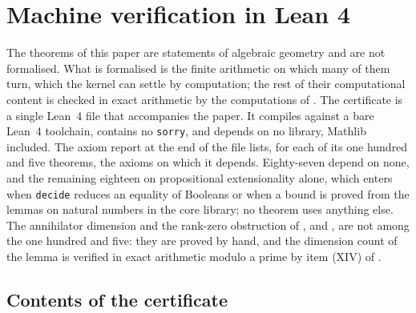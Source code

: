 \section{Machine verification in Lean 4}\label{sec:lean}

The theorems of this paper are statements of algebraic geometry and are not
formalised. What is formalised is the finite arithmetic on which many of them
turn, which the kernel can settle by computation; the rest of their
computational content is checked in exact arithmetic by the computations of
. The certificate is a single Lean~4 file that
accompanies the paper. It compiles against a bare Lean~4 toolchain, contains
no \texttt{sorry}, and depends on no library, Mathlib included. The axiom
report at the end of the file lists, for each of its one hundred and five theorems,
the axioms on which it depends. Eighty-seven depend on none, and the remaining
eighteen on propositional extensionality alone, which enters when
\texttt{decide} reduces an equality of Booleans or when a bound is proved from
the lemmas on natural numbers in the core library; no theorem uses anything
else. The annihilator dimension and the rank-zero obstruction of
,  and , are not
among the one hundred and five: they are proved by hand, and the dimension count of
the lemma is verified in exact arithmetic modulo a prime by item (XIV) of
.

\subsection{Contents of the certificate}


